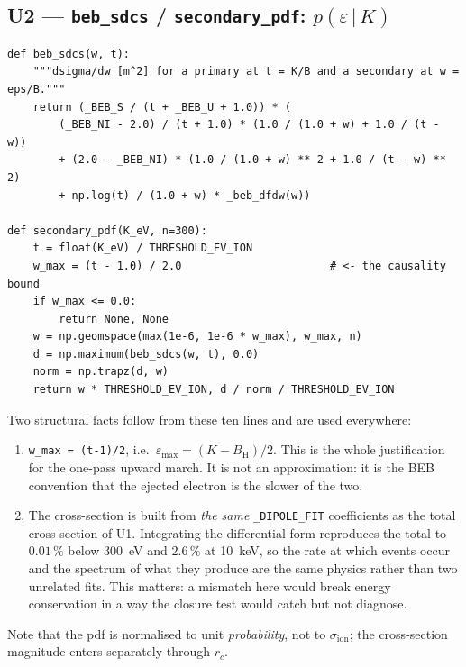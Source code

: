 \documentclass[11pt,a4paper]{article}
\newcommand{\code}[1]{\texttt{\small #1}}
\newcommand{\eps}{\varepsilon}
\newcommand{\BH}{B_{\mathrm{H}}}
\newcommand{\sion}{\sigma_{\mathrm{ion}}}
\begin{document}
\subsection*{U2 --- \code{beb\_sdcs} / \code{secondary\_pdf}: $p(\eps\,|\,K)$}

\begin{lstlisting}
def beb_sdcs(w, t):
    """dsigma/dw [m^2] for a primary at t = K/B and a secondary at w = eps/B."""
    return (_BEB_S / (t + _BEB_U + 1.0)) * (
        (_BEB_NI - 2.0) / (t + 1.0) * (1.0 / (1.0 + w) + 1.0 / (t - w))
        + (2.0 - _BEB_NI) * (1.0 / (1.0 + w) ** 2 + 1.0 / (t - w) ** 2)
        + np.log(t) / (1.0 + w) * _beb_dfdw(w))

def secondary_pdf(K_eV, n=300):
    t = float(K_eV) / THRESHOLD_EV_ION
    w_max = (t - 1.0) / 2.0                       # <- the causality bound
    if w_max <= 0.0:
        return None, None
    w = np.geomspace(max(1e-6, 1e-6 * w_max), w_max, n)
    d = np.maximum(beb_sdcs(w, t), 0.0)
    norm = np.trapz(d, w)
    return w * THRESHOLD_EV_ION, d / norm / THRESHOLD_EV_ION
\end{lstlisting}

Two structural facts follow from these ten lines and are used everywhere:

\begin{enumerate}[leftmargin=1.6em]
\item \code{w\_max = (t-1)/2}, i.e.\ $\eps_{\max}=(K-\BH)/2$.  This is the whole
      justification for the one-pass upward march.  It is not an approximation:
      it is the BEB convention that the ejected electron is the slower of the
      two.
\item The cross-section is built from \emph{the same} \code{\_DIPOLE\_FIT}
      coefficients as the total cross-section of U1.  Integrating the
      differential form reproduces the total to $0.01\,\%$ below 300~eV and
      $2.6\,\%$ at 10~keV, so the rate at which events occur and the spectrum
      of what they produce are the same physics rather than two unrelated fits.
      This matters: a mismatch here would break energy conservation in a way
      the closure test would catch but not diagnose.
\end{enumerate}

Note that the pdf is normalised to unit \emph{probability}, not to
$\sion$; the cross-section magnitude enters separately through $r_c$.
\end{document}
